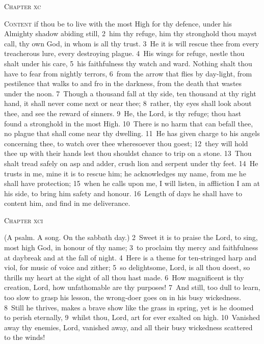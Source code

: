 \documentclass[10pt]{book} %
\begin{document}
\begin{large}\begin{center}\textsc{Chapter xc}\end{center}\end{large}
\lettrine[lines=2]{C}{ontent} if thou be to live with the most High for thy defence, under his Almighty shadow abiding still, \textcolor{benred8}{2}~him thy refuge, him thy stronghold thou mayst call, thy own God, in whom is all thy trust. \textcolor{benred8}{3}~He it is will rescue thee from every treacherous lure, every destroying plague. \textcolor{benred8}{4}~His wings for refuge, nestle thou shalt under his care, \textcolor{benred8}{5}~his faithfulness thy watch and ward. Nothing shalt thou have to fear from nightly terrors, \textcolor{benred8}{6}~from the arrow that flies by day-light, from pestilence that walks to and fro in the darkness, from the death that wastes under the noon. \textcolor{benred8}{7}~Though a thousand fall at thy side, ten thousand at thy right hand, it shall never come next or near thee; \textcolor{benred8}{8}~rather, thy eyes shall look about thee, and see the reward of sinners.
\textcolor{benred8}{9}~He, the Lord, is thy refuge; thou hast found a stronghold in the most High. \textcolor{benred8}{10}~There is no harm that can befall thee, no plague that shall come near thy dwelling. \textcolor{benred8}{11}~He has given charge to his angels concerning thee, to watch over thee wheresoever thou goest; \textcolor{benred8}{12}~they will hold thee up with their hands lest thou shouldst chance to trip on a stone. \textcolor{benred8}{13}~Thou shalt tread safely on asp and adder, crush lion and serpent under thy feet.
\textcolor{benred8}{14}~He trusts in me, mine it is to rescue him; he acknowledges my name, from me he shall have protection; \textcolor{benred8}{15}~when he calls upon me, I will listen, in affliction I am at his side, to bring him safety and honour. \textcolor{benred8}{16}~Length of days he shall have to content him, and find in me deliverance.
\begin{large}\begin{center}\textsc{Chapter xci}\end{center}\end{large}
(A psalm. A song. On the sabbath day.)
\textcolor{benred8}{2}~Sweet it is to praise the Lord, to sing, most high God, in honour of thy name; \textcolor{benred8}{3}~to proclaim thy mercy and faithfulness at daybreak and at the fall of night. \textcolor{benred8}{4}~Here is a theme for ten-stringed harp and viol, for music of voice and zither; \textcolor{benred8}{5}~so delightsome, Lord, is all thou doest, so thrills my heart at the sight of all thou hast made. \textcolor{benred8}{6}~How magnificent is thy creation, Lord, how unfathomable are thy purposes! \textcolor{benred8}{7}~And still, too dull to learn, too slow to grasp his lesson, the wrong-doer goes on in his busy wickedness. \textcolor{benred8}{8}~Still he thrives, makes a brave show like the grass in spring, yet is he doomed to perish eternally, \textcolor{benred8}{9}~whilst thou, Lord, art for ever exalted on high. \textcolor{benred8}{10}~Vanished away thy enemies, Lord, vanished away, and all their busy wickedness scattered to the winds!
\end{document}
